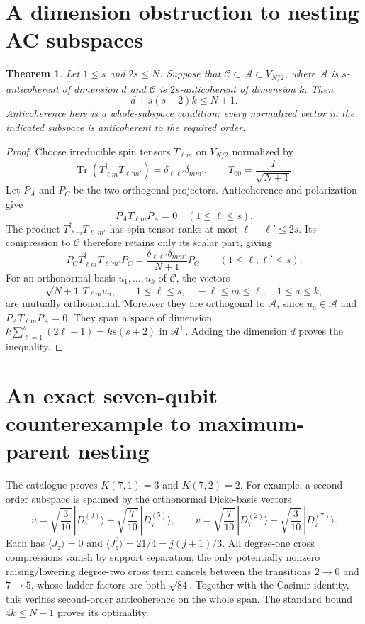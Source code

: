 \documentclass{article}
\newtheorem{theorem}{Theorem}
\begin{document}
\section*{A dimension obstruction to nesting AC subspaces}
\begin{theorem}
Let $1\le s$ and $2s\le N$. Suppose that
$\mathcal C\subset\mathcal A\subset V_{N/2}$, where $\mathcal A$ is
$s$-anticoherent of dimension $d$ and $\mathcal C$ is $2s$-anticoherent
of dimension $k$. Then
\[
\boxed{d+s(s+2)k\le N+1.}
\]
Anticoherence here is a whole-subspace condition: every normalized vector
in the indicated subspace is anticoherent to the required order.
\end{theorem}
\begin{proof}
Choose irreducible spin tensors $T_{\ell m}$ on $V_{N/2}$ normalized by
\[
\operatorname{Tr}(T_{\ell m}^{\dagger}T_{\ell' m'})
 =\delta_{\ell\ell'}\delta_{mm'},\qquad
T_{00}=\frac{I}{\sqrt{N+1}}.
\]
Let $P_A$ and $P_C$ be the two orthogonal projectors. Anticoherence and
polarization give
\[
 P_A T_{\ell m}P_A=0\quad(1\le\ell\le s).
\]
The product $T_{\ell m}^{\dagger}T_{\ell' m'}$ has spin-tensor ranks
at most $\ell+\ell'\le2s$. Its compression to $\mathcal C$ therefore
retains only its scalar part, giving
\[
 P_C T_{\ell m}^{\dagger}T_{\ell' m'}P_C
 =\frac{\delta_{\ell\ell'}\delta_{mm'}}{N+1}P_C
 \qquad(1\le\ell,\ell'\le s).
\]
For an orthonormal basis $u_1,\ldots,u_k$ of $\mathcal C$, the vectors
\[
 \sqrt{N+1}\,T_{\ell m}u_a,
 \qquad 1\le\ell\le s,\quad -\ell\le m\le\ell,\quad 1\le a\le k,
\]
are mutually orthonormal. Moreover they are orthogonal to
$\mathcal A$, since $u_a\in\mathcal A$ and
$P_A T_{\ell m}P_A=0$. They span a space of dimension
$k\sum_{\ell=1}^s(2\ell+1)=ks(s+2)$ in $\mathcal A^{\perp}$.
Adding the dimension $d$ proves the inequality.
\end{proof}

\section*{An exact seven-qubit counterexample to maximum-parent nesting}
The catalogue proves $K(7,1)=3$ and $K(7,2)=2$. For example, a
second-order subspace is spanned by the orthonormal Dicke-basis vectors
\[
 u=\sqrt{\frac3{10}}\,|D_7^{(0)}\rangle+
      \sqrt{\frac7{10}}\,|D_7^{(5)}\rangle,
 \qquad
 v=\sqrt{\frac7{10}}\,|D_7^{(2)}\rangle-
      \sqrt{\frac3{10}}\,|D_7^{(7)}\rangle.
\]
Each has $\langle J_z\rangle=0$ and
$\langle J_z^2\rangle=21/4=j(j+1)/3$. All degree-one cross
compressions vanish by support separation; the only potentially nonzero
raising/lowering degree-two cross term cancels between the transitions
$2\to0$ and $7\to5$, whose ladder factors are both $\sqrt{84}$.
Together with the Casimir identity, this verifies second-order
anticoherence on the whole span. The standard bound $4k\le N+1$
proves its optimality.
\end{document}
